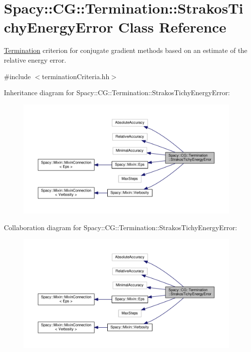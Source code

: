 \hypertarget{classSpacy_1_1CG_1_1Termination_1_1StrakosTichyEnergyError}{}\section{Spacy\+:\+:CG\+:\+:Termination\+:\+:Strakos\+Tichy\+Energy\+Error Class Reference}
\label{classSpacy_1_1CG_1_1Termination_1_1StrakosTichyEnergyError}


\hyperlink{namespaceSpacy_1_1CG_1_1Termination}{Termination} criterion for conjugate gradient methods based on an estimate of the relative energy error.  




{\ttfamily \#include $<$termination\+Criteria.\+hh$>$}



Inheritance diagram for Spacy\+:\+:CG\+:\+:Termination\+:\+:Strakos\+Tichy\+Energy\+Error\+:
\nopagebreak
\begin{figure}[H]
\begin{center}
\leavevmode
\includegraphics[width=350pt]{classSpacy_1_1CG_1_1Termination_1_1StrakosTichyEnergyError__inherit__graph}
\end{center}
\end{figure}


Collaboration diagram for Spacy\+:\+:CG\+:\+:Termination\+:\+:Strakos\+Tichy\+Energy\+Error\+:
\nopagebreak
\begin{figure}[H]
\begin{center}
\leavevmode
\includegraphics[width=350pt]{classSpacy_1_1CG_1_1Termination_1_1StrakosTichyEnergyError__coll__graph}
\end{center}
\end{figure}
